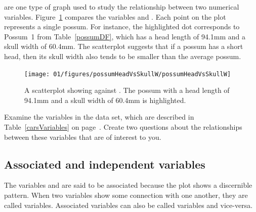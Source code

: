 



 are one type of graph used to study the relationship between two numerical variables. Figure~\ref{possumHeadVsSkullW} compares the variables  and . Each point on the plot represents a single possum. For instance, the highlighted dot corresponds to Possum~1 from Table~\ref{possumDF}, which has a head length of 94.1mm and a skull width of 60.4mm. The scatterplot suggests that if a possum has a short head, then its skull width also tends to be smaller than the average possum.
\begin{figure}
\centering
\texttt{[image: 01/figures/possumHeadVsSkullW/possumHeadVsSkullW]}
\caption{A scatterplot showing  against . The possum with a head length of 94.1mm and a skull width of 60.4mm is highlighted.}
\label{possumHeadVsSkullW}
\end{figure}

\begin{exercise}
Examine the variables in the  data set, which are described in Table~\ref{carsVariables} on page~\pageref{carsVariables}. Create two questions about the relationships between these variables that are of interest to you.
\end{exercise}


\subsection{Associated and independent variables}
\label{associatedAndIndependentVariablesSubsection}

The variables  and  are said to be associated because the plot shows a discernible pattern. When two variables show some connection with one another, they are called  variables. Associated variables can also be called  variables and vice-versa.

